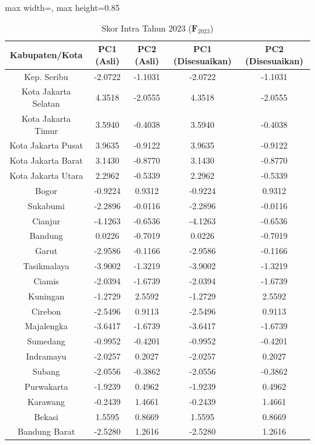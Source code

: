 \begin{table}[H]
\centering
\caption{Skor Intra Tahun 2023 ($\mathbf{F}_{2023}$)} \label{tab:appskor_intra_2023}
\begin{adjustbox}{max width=\textwidth, max height=0.85\textheight}
\begin{tabular}{|c|c|c|c|c|}
\hline
\textbf{Kabupaten/Kota} & \textbf{PC1 (Asli)} & \textbf{PC2 (Asli)} & \textbf{PC1 (Disesuaikan)} & \textbf{PC2 (Disesuaikan)} \\
\hline
Kep. Seribu & -2.0722 & -1.1031 & -2.0722 & -1.1031 \\
Kota Jakarta Selatan & 4.3518 & -2.0555 & 4.3518 & -2.0555 \\
Kota Jakarta Timur & 3.5940 & -0.4038 & 3.5940 & -0.4038 \\
Kota Jakarta Pusat & 3.9635 & -0.9122 & 3.9635 & -0.9122 \\
Kota Jakarta Barat & 3.1430 & -0.8770 & 3.1430 & -0.8770 \\
Kota Jakarta Utara & 2.2962 & -0.5339 & 2.2962 & -0.5339 \\
Bogor & -0.9224 & 0.9312 & -0.9224 & 0.9312 \\
Sukabumi & -2.2896 & -0.0116 & -2.2896 & -0.0116 \\
Cianjur & -4.1263 & -0.6536 & -4.1263 & -0.6536 \\
Bandung & 0.0226 & -0.7019 & 0.0226 & -0.7019 \\
Garut & -2.9586 & -0.1166 & -2.9586 & -0.1166 \\
Tasikmalaya & -3.9002 & -1.3219 & -3.9002 & -1.3219 \\
Ciamis & -2.0394 & -1.6739 & -2.0394 & -1.6739 \\
Kuningan & -1.2729 & 2.5592 & -1.2729 & 2.5592 \\
Cirebon & -2.5496 & 0.9113 & -2.5496 & 0.9113 \\
Majalengka & -3.6417 & -1.6739 & -3.6417 & -1.6739 \\
Sumedang & -0.9952 & -0.4201 & -0.9952 & -0.4201 \\
Indramayu & -2.0257 & 0.2027 & -2.0257 & 0.2027 \\
Subang & -2.0556 & -0.3862 & -2.0556 & -0.3862 \\
Purwakarta & -1.9239 & 0.4962 & -1.9239 & 0.4962 \\
Karawang & -0.2439 & 1.4661 & -0.2439 & 1.4661 \\
Bekasi & 1.5595 & 0.8669 & 1.5595 & 0.8669 \\
Bandung Barat & -2.5280 & 1.2616 & -2.5280 & 1.2616 \\

\end{tabular}
\end{adjustbox}
\end{table}
